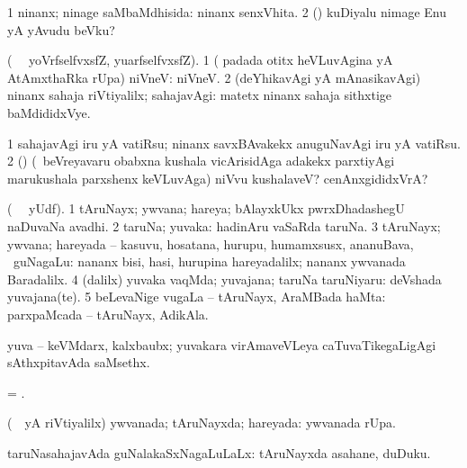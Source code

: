 \noindent
\gl{\pagu} 
\bmng
\bnum
\num{1}  ninanx; ninage saMbaMdhisida:  ninanx senxVhita. 
\num{2}  (\AmA) kuDiyalu nimage Enu yA yAvudu beVku?
\enum
\emng
\eentry



\bentry
{} 
\gl{\sanA} 
\bmng
(\bava\  \ucAcx\ yoVrfselfvxsfZ, yuarfselfvxsfZ). 
\bnum
\num{1} ( padada otitx heVLuvAgina yA AtAmxthaRka rUpa) niVneV:  niVneV. 
\num{2} (deYhikavAgi yA mAnasikavAgi) ninanx sahaja riVtiyalilx; sahajavAgi:  matetx ninanx sahaja sithxtige baMdididxVye.
\enum
\emng         

\noindent
\gl{\pagu} 
\bmng
\bnum
\num{1}  sahajavAgi iru yA vatiRsu; ninanx  savxBAvakekx anuguNavAgi iru yA vatiRsu. 
\num{2}  (\ashi) (\kanmu\ beVreyavaru obabxna kushala vicArisidAga adakekx parxtiyAgi marukushala parxshenx keVLuvAga) niVvu kushalaveV? cenAnxgididxVrA?
\enum
\emng
\eentry

\bentry
{} 
\gl{\nA} 
\bmng
(\bava\  \ucAcx\ yUdf). 
\bnum
\num{1} tAruNayx; ywvana; hareya; bAlayxkUkx pwrxDhadashegU naDuvaNa avadhi. 
\num{2} taruNa; yuvaka:  hadinAru vaSaRda taruNa. 
\num{3} tAruNayx; ywvana; hareyada -- kasuvu, hosatana, hurupu, humamxsusx, ananuBava, \mo\ guNagaLu:  nananx bisi, hasi, hurupina hareyadalilx; nananx ywvanada Baradalilx.  
\num{4} (\bava dalilx) yuvaka vaqMda; yuvajana; taruNa taruNiyaru:  deVshada yuvajana(te). 
\num{5} beLevaNige \mo vugaLa -- tAruNayx, AraMBada haMta:  parxpaMcada -- tAruNayx, AdikAla.
\enum
\emng
\eentry

\bentry
{}
\gl{\nA}
\bmng
yuva -- keVMdarx, kalxbaubx; yuvakara virAmaveVLeya caTuvaTikegaLigAgi sAthxpitavAda saMsethx.
\emng
\eentry

\bentry
{}
\gl{\nA} 
\bmng
= .
\emng
\eentry

\bentry
{} 
\gl{\gu} 
\bmng
(\kanmu\ \rUpa\ yA riVtiyalilx) 
\banum
{} ywvanada; tAruNayxda; hareyada:  ywvanada rUpa. 

 taruNasahajavAda guNalakaSxNagaLuLaLx:  tAruNayxda asahane, duDuku. 

